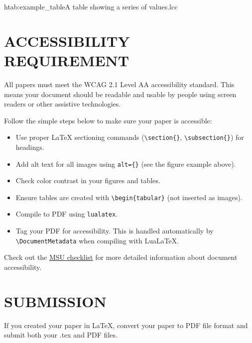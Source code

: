 \documentclass{issw}
\begin{document}
\begin{taggedtable}{h}{tab:example_table}{A table showing a series of values.}{lcc}
\end{taggedtable}

\section{ACCESSIBILITY REQUIREMENT}
All papers must meet the WCAG 2.1 Level AA accessibility standard. This means your document should be readable and usable by people using screen readers or other assistive technologies.

Follow the simple steps below to make sure your paper is accessible:  
\begin{itemize}
 \item Use proper LaTeX sectioning commands (\verb|\section{}|, \verb|\subsection{}|) for headings.
 \item Add alt text for all images using \verb|alt={}| (see the figure example above).
 \item Check color contrast in your figures and tables.
 \item Ensure tables are created with \verb|\begin{tabular}| (not inserted as images).
 \item Compile to PDF using \verb|lualatex|.
 \item Tag your PDF for accessibility. This is handled automatically by \verb|\DocumentMetadata| when compiling with LuaLaTeX.
\end{itemize}
Check out the \href{https://guides.lib.montana.edu/accessibility/checklist}{MSU checklist} for more detailed information about document accessibility.

\section{SUBMISSION}
If you created your paper in LaTeX, convert your paper to PDF file format and submit both your .tex and PDF files.
\end{document}
